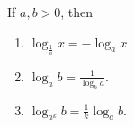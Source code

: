 \begin{frame}

\begin{proposition}
If $a, b > 0$, then
\begin{enumerate}
\item  $\log_{\frac{1}{a}}x=-\log_a x$
\item  $\log_{a}b=\frac{1}{\log_b a}$.
\item  $\log_{a^k}b=\frac{1}{k}\log_a b$.
\end{enumerate}
\end{proposition}



\end{frame}